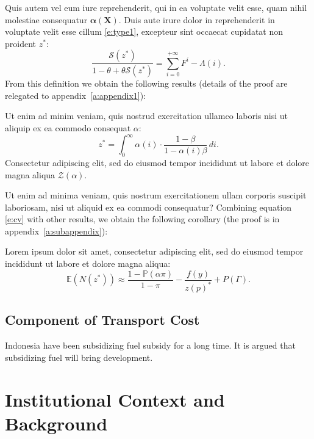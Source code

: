 \documentclass[letterpaper,12pt,leqno]{article}
\begin{document}
Quis autem vel eum iure reprehenderit, qui in ea voluptate velit esse, quam nihil molestiae consequatur $\bm{\alpha(X)}$. Duis aute irure dolor in reprehenderit in voluptate velit esse cillum \eqref{e:type1}, excepteur sint occaecat cupidatat non proident $z^*$:
\begin{equation*}
\frac{\mathcal{S}(z^*)}{1 -\theta + \theta \mathcal{S}(z^*)} = \sum_{i=0}^{+\infty}F^{i} - \Lambda(i).
\end{equation*}
From this definition we obtain the following results (details of the proof are relegated to appendix~\ref{a:appendix1}):

\begin{lemma}\label{p:cv} Ut enim ad minim veniam, quis nostrud exercitation ullamco laboris nisi ut aliquip ex ea commodo consequat $\alpha$:
\begin{equation}
z^* = \int_{0}^{\infty} \alpha(i) \cdot \frac{1-\beta}{1-\alpha(i)\beta}\,di.
\label{e:cv}\end{equation}
Consectetur adipiscing elit, sed do eiusmod tempor incididunt ut labore et dolore magna aliqua $\mathcal{Z}(\alpha)$. \end{lemma}

Ut enim ad minima veniam, quis nostrum exercitationem ullam corporis suscipit laboriosam, nisi ut aliquid ex ea commodi consequatur? Combining equation \eqref{e:cv} with other results, we obtain the following corollary (the proof is in appendix~\ref{a:subappendix}): 

\begin{corollary} Lorem ipsum dolor sit amet, consectetur adipiscing elit, sed do eiusmod tempor incididunt ut labore et dolore magna aliqua:
\begin{equation*}
\mathbb{E}(N(z^*)) \approx \frac{1-\mathbb{P}(\alpha\pi)}{1-\pi}- \frac{f(y)}{z(p)^*} +P(\Gamma).
\end{equation*}\end{corollary}

\subsection{Component of Transport Cost}

Indonesia have been subsidizing fuel subsidy for a long time. It is argued that subsidizing fuel will bring development.

\section{Institutional Context and Background}\label{s:context}
\end{document}
